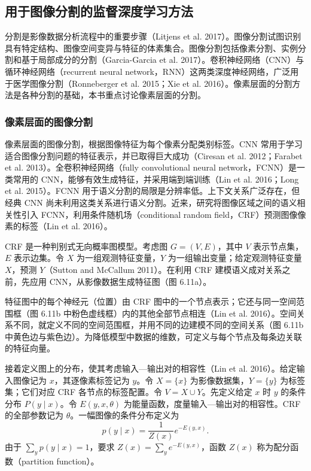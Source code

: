 \subsection{用于图像分割的监督深度学习方法}

分割是影像数据分析流程中的重要步骤（Litjens et al. 2017）。图像分割试图识别具有特定结构、图像空间变异与特征的体素集合。图像分割包括像素分割、实例分割和基于局部成分的分割（Garcia-Garcia et al. 2017）。卷积神经网络（CNN）与循环神经网络（recurrent neural network，RNN）这两类深度神经网络，广泛用于医学图像分割（Ronneberger et al. 2015；Xie et al. 2016）。像素层面的分割方法是各种分割的基础，本书重点讨论像素层面的分割。

\subsubsection{像素层面的图像分割}

像素层面的图像分割，根据图像特征为每个像素分配类别标签。CNN 常用于学习适合图像分割问题的特征表示，并已取得巨大成功（Ciresan et al. 2012；Farabet et al. 2013）。全卷积神经网络（fully convolutional neural network，FCNN）是一类常用的 CNN，能够有效生成特征，并采用端到端训练（Lin et al. 2016；Long et al. 2015）。FCNN 用于语义分割的局限是分辨率低。上下文关系广泛存在，但经典 CNN 尚未利用这类关系进行语义分割。近来，研究将图像区域之间的语义相关性引入 FCNN，利用条件随机场（conditional random field，CRF）预测图像像素的标签（Lin et al. 2016）。


CRF 是一种判别式无向概率图模型。考虑图 $G=(V,E)$，其中 $V$ 表示节点集，$E$ 表示边集。令 $X$ 为一组观测特征变量，$Y$ 为一组输出变量；给定观测特征变量 $X$，预测 $Y$（Sutton and McCallum 2011）。在利用 CRF 建模语义成对关系之前，先应用 CNN，从影像数据生成特征图（图 6.11a）。


特征图中的每个神经元（位置）由 CRF 图中的一个节点表示；它还与同一空间范围框（图 6.11b 中粉色虚线框）内的其他全部节点相连（Lin et al. 2016）。空间关系不同，就定义不同的空间范围框，并用不同的边建模不同的空间关系（图 6.11b 中黄色边与紫色边）。为降低模型中数据的维数，可定义与每个节点及每条边关联的特征向量。

接着定义图上的分布，使其考虑输入—输出对的相容性（Lin et al. 2016）。给定输入图像记为 $x$，其逐像素标签记为 $y$。令 $X=\{x\}$ 为影像数据集，$Y=\{y\}$ 为标签集；它们对应 CRF 各节点的标签配置。令 $V=X\cup Y$。先定义给定 $x$ 时 $y$ 的条件分布 $P(y\mid x)$。令 $E(y,x,\theta)$ 为能量函数，度量输入—输出对的相容性。CRF 的全部参数记为 $\theta$。一幅图像的条件分布定义为
\begin{equation}
p(y\mid x)=\frac1{Z(x)}e^{-E(y,x)}.
\tag{6.129}
\end{equation}
由于 $\sum_yp(y\mid x)=1$，要求 $Z(x)=\sum_ye^{-E(y,x)}$，函数 $Z(x)$ 称为配分函数（partition function）。

